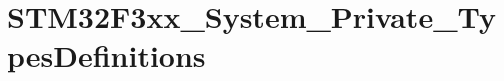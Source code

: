 \hypertarget{group___s_t_m32_f3xx___system___private___types_definitions}{
\section{STM32F3xx\_\-System\_\-Private\_\-TypesDefinitions}
\label{group___s_t_m32_f3xx___system___private___types_definitions}
}
